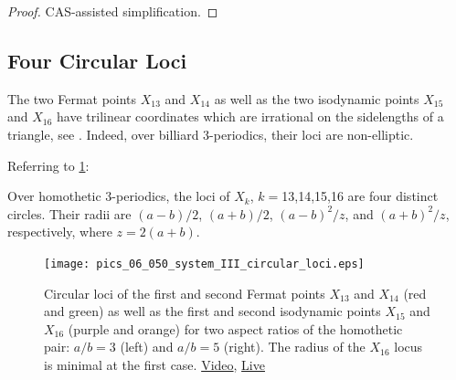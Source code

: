 \begin{proof}
CAS-assisted simplification.
\end{proof}

\subsection{Four Circular Loci}

The two Fermat points $X_{13}$ and $X_{14}$ as well as the two isodynamic points $X_{15}$ and $X_{16}$ have trilinear coordinates which are irrational on the sidelengths of a triangle, see \cite{etc}. Indeed, over billiard 3-periodics, their loci are non-elliptic.

Referring to \cref{fig:06-homoth-circ-loci}:

\begin{proposition}
Over homothetic 3-periodics, the loci of $X_k$, $k=$13,14,15,16 are four distinct circles. Their radii are $(a-b)/2$, $(a+b)/2$, $(a-b)^2/z$, and $(a+b)^2/z$, respectively, where $z=2(a+b)$.
\label{prop:06-homoth-four-circles}
\end{proposition}

\begin{figure}
    \centering
    \texttt{[image: pics\_06\_050\_system\_III\_circular\_loci.eps]}
    \caption{Circular loci of the first and second Fermat points $X_{13}$ and $X_{14}$ (red and green) as well as the first and second isodynamic points $X_{15}$ and $X_{16}$ (purple and orange) for two aspect ratios of the homothetic pair: $a/b=3$ (left) and $a/b=5$ (right). The radius of the $X_{16}$ locus is minimal at the first case. \href{https://youtu.be/ZwTfwaJJitE}{Video}, \href{https://bit.ly/3yF0wc9}{Live}}
    \label{fig:06-homoth-circ-loci}
\end{figure}
